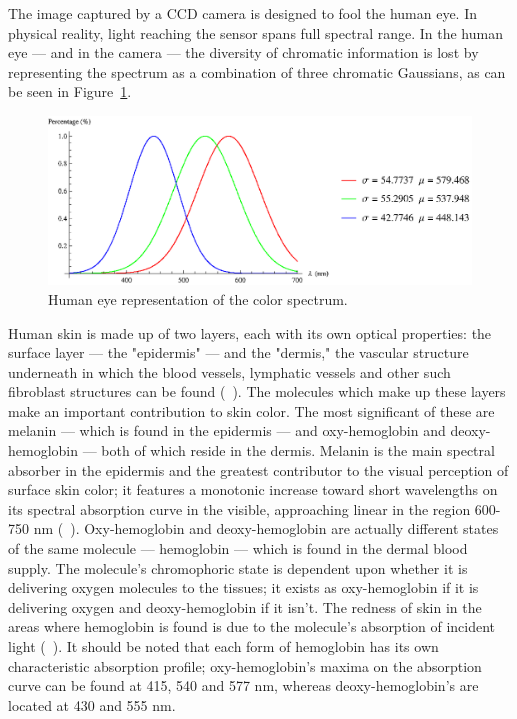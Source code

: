 The image captured by a CCD camera is designed to fool the human eye. In physical reality, light reaching the sensor spans full spectral range. In the human eye --- and in the camera --- the diversity of chromatic information is lost by representing the spectrum as a combination of three chromatic Gaussians, as can be seen in Figure~\ref{fig:spectrum}.

\begin{figure}[h!]
  \centering
    \includegraphics[width=\textwidth]{Chapter2/Figs/spectrum.eps}
    \caption{Human eye representation of the color spectrum.}  \label{fig:spectrum}
\end{figure}

Human skin is made up of two layers, each with its own optical properties: the surface layer --- the "epidermis" --- and the "dermis," the vascular structure underneath in which the blood vessels, lymphatic vessels and other such fibroblast structures can be found (~\cite{Stamatas2004}). The molecules which make up these layers make an important contribution to skin color. The most significant of these are melanin --- which is found in the epidermis --- and oxy-hemoglobin and deoxy-hemoglobin --- both of which reside in the dermis. Melanin is the main spectral absorber in the epidermis and the greatest contributor to the visual perception of surface skin color; it features a monotonic increase toward short wavelengths on its spectral absorption curve in the visible, approaching linear in the region 600-750 nm (~\cite{Stamatas2004,Kollias1995,Zonios2001}). Oxy-hemoglobin and deoxy-hemoglobin are actually different states of the same molecule --- hemoglobin --- which is found in the dermal blood supply. The molecule's chromophoric state is dependent upon whether it is delivering oxygen molecules to the tissues; it exists as oxy-hemoglobin if it is delivering oxygen and deoxy-hemoglobin if it isn't. The redness of skin in the areas where hemoglobin is found is due to the molecule's absorption of incident light (~\cite{Kollias1995}). It should be noted that each form of hemoglobin has its own characteristic absorption profile; oxy-hemoglobin's maxima on the absorption curve can be found at 415, 540 and 577 nm, whereas deoxy-hemoglobin's are located at 430 and 555 nm.

